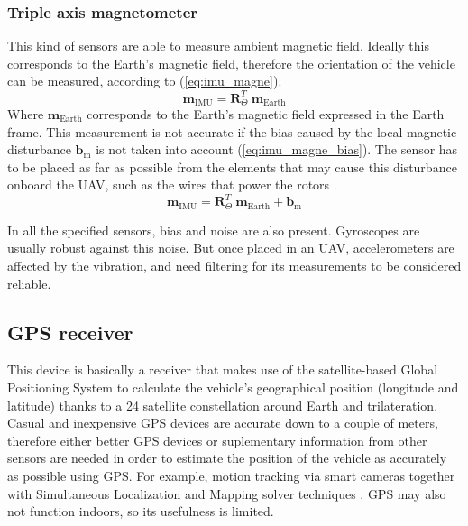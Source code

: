 \documentclass[journal]{IEEEtran}
\newcommand*{\subb}[1]{_{\mathrm{#1}}}
\begin{document}
	\subsubsection{Triple axis magnetometer} This kind of sensors are able to measure ambient magnetic field. Ideally this corresponds to the Earth's magnetic field, therefore the orientation of the vehicle can be measured, according to (\ref{eq:imu_magne}).
	\begin{equation} \label{eq:imu_magne}
	\bm{m}\subb{IMU}= \bm{R}^T_\Theta \  \bm{m}\subb{Earth}
	\end{equation}
	Where $\bm{m}\subb{Earth}$ corresponds to the Earth's magnetic field expressed in the Earth frame. This measurement is not accurate if the bias caused by the local magnetic disturbance $\bm{b}\subb{m}$ is not taken into account (\ref{eq:imu_magne_bias}). The sensor has to be placed as far as possible from the elements that may cause this disturbance onboard the UAV, such as the wires that power the rotors \cite{modelling_control_mahony}.
	\begin{equation} \label{eq:imu_magne_bias}
	\bm{m}\subb{IMU}= \bm{R}^T_\Theta \  \bm{m}\subb{Earth} + \bm{b}\subb{m}
	\end{equation}
	
	In all the specified sensors, bias and noise are also present. Gyroscopes are usually robust against this noise. But once placed in an UAV, accelerometers are affected by the vibration, and need filtering for its measurements to be considered reliable.
	
	\subsection{GPS receiver}
	This device is basically a receiver that makes use of the satellite-based Global Positioning System to calculate the vehicle's geographical position (longitude and latitude) thanks to a 24 satellite constellation around Earth and trilateration. Casual and inexpensive GPS devices are accurate down to a couple of meters, therefore either better GPS devices or suplementary information from other sensors are needed in order to estimate the position of the vehicle as accurately as possible using GPS. For example, motion tracking via smart cameras together with Simultaneous Localization and Mapping solver techniques \cite{modelling_control_mahony}. GPS may also not function indoors, so its usefulness is limited.
	
\end{document}
